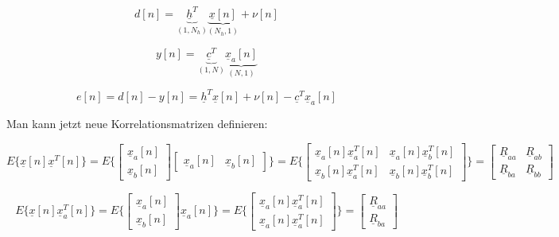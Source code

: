 \begin{equation}
  d[n] = \underbrace{\underline{h}^T}_{(1,N_h)} \underbrace{\underline{x}[n]}_{(N_h,1)} + \nu [n]
\end{equation}

\begin{equation}
  y[n] = \underbrace{\underline{c}^T}_{(1,N)} \underbrace{\underline{x}_a[n]}_{(N,1)}
\end{equation}

\begin{equation}
 e[n] = d[n] - y[n] = \underline{h}^T \underline{x}[n] + \nu [n] - \underline{c}^T \underline{x}_a[n]
\end{equation}

Man kann jetzt neue Korrelationsmatrizen definieren:

\begin{equation}
 E\{\underline{x}[n] \underline{x}^T[n]\} = E\{\begin{bmatrix} \underline{x}_a[n] \\ \underline{x}_b[n] \end{bmatrix} \begin{bmatrix} \underline{x}_a[n] & \underline{x}_b[n] \end{bmatrix}\} = E\{\begin{bmatrix} \underline{x}_a[n] \underline{x}_a^T[n] & \underline{x}_a[n] \underline{x}_b^T[n] \\ \underline{x}_b[n] \underline{x}_a^T[n] & \underline{x}_b[n] \underline{x}_b^T[n] \end{bmatrix}\} = \begin{bmatrix} \underline{R}_{aa} & \underline{R}_{ab} \\ \underline{R}_{ba} & \underline{R}_{bb} \end{bmatrix}
\end{equation}

\begin{equation}
 E\{\underline{x}[n] \underline{x}_a^T[n]\} = E\{\begin{bmatrix} \underline{x}_a[n] \\ \underline{x}_b[n] \end{bmatrix} \underline{x}_a[n]\} = E\{\begin{bmatrix} \underline{x}_a[n] \underline{x}_a^T[n] \\ \underline{x}_a[n] \underline{x}_a^T[n] \end{bmatrix} \} = \begin{bmatrix} \underline{R}_{aa} \\ \underline{R}_{ba} \end{bmatrix}
\end{equation}

